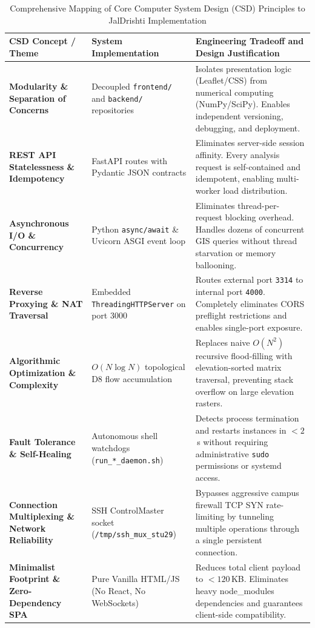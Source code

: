 \documentclass[11pt,a4paper]{article}
\begin{document}
\begin{table}[t]
\centering
\small
\caption{Comprehensive Mapping of Core Computer System Design (CSD) Principles to JalDrishti Implementation}
\label{tab:csd_mapping}
\vspace{-0.2cm}
\begin{tabularx}{\linewidth}{p{3.8cm}p{4.2cm}X}
\toprule
\textbf{CSD Concept / Theme} & \textbf{System Implementation} & \textbf{Engineering Tradeoff and Design Justification} \\
\midrule
\textbf{Modularity \& Separation of Concerns} & Decoupled \texttt{frontend/} and \texttt{backend/} repositories & Isolates presentation logic (Leaflet/CSS) from numerical computing (NumPy/SciPy). Enables independent versioning, debugging, and deployment. \\
\textbf{REST API Statelessness \& Idempotency} & FastAPI routes with Pydantic JSON contracts & Eliminates server-side session affinity. Every analysis request is self-contained and idempotent, enabling multi-worker load distribution. \\
\textbf{Asynchronous I/O \& Concurrency} & Python \texttt{async/await} \& Uvicorn ASGI event loop & Eliminates thread-per-request blocking overhead. Handles dozens of concurrent GIS queries without thread starvation or memory ballooning. \\
\textbf{Reverse Proxying \& NAT Traversal} & Embedded \texttt{ThreadingHTTPServer} on port 3000 & Routes external port \texttt{3314} to internal port \texttt{4000}. Completely eliminates CORS preflight restrictions and enables single-port exposure. \\
\textbf{Algorithmic Optimization \& Complexity} & $O(N \log N)$ topological D8 flow accumulation & Replaces naive $O(N^2)$ recursive flood-filling with elevation-sorted matrix traversal, preventing stack overflow on large elevation rasters. \\
\textbf{Fault Tolerance \& Self-Healing} & Autonomous shell watchdogs (\texttt{run\_*\_daemon.sh}) & Detects process termination and restarts instances in $<2$\,s without requiring administrative \texttt{sudo} permissions or systemd access. \\
\textbf{Connection Multiplexing \& Network Reliability} & SSH ControlMaster socket (\texttt{/tmp/ssh_mux_stu29}) & Bypasses aggressive campus firewall TCP SYN rate-limiting by tunneling multiple operations through a single persistent connection. \\
\textbf{Minimalist Footprint \& Zero-Dependency SPA} & Pure Vanilla HTML/JS (No React, No WebSockets) & Reduces total client payload to $<120$\,KB. Eliminates heavy node\_modules dependencies and guarantees client-side compatibility. \\
\bottomrule
\end{tabularx}
\end{table}
\end{document}
